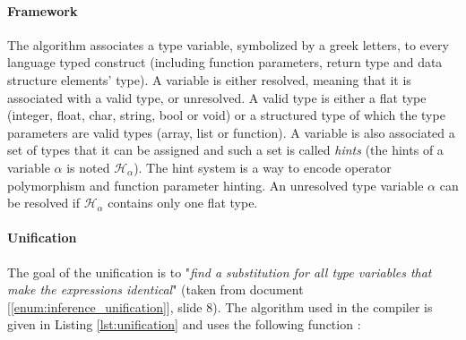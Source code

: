 \documentclass[a4paper,11pt]{article}
\begin{document}
\paragraph{Framework} The algorithm associates a type variable, symbolized by a greek letters, to every language typed construct (including function parameters, return type and data structure elements' type). A variable is either resolved, meaning that it is associated with a valid type, or unresolved. A valid type is either a flat type (integer, float, char, string, bool or void) or a structured type of which the type parameters are valid types (array, list or function). A variable is also associated a set of types that it can be assigned and such a set is called \textit{hints} (the hints of a variable $\alpha$ is noted $\mathcal{H}_\alpha$). The hint system is a way to encode operator polymorphism and function parameter hinting. An unresolved type variable $\alpha$ can be resolved if $\mathcal{H}_\alpha$ contains only one flat type. 
\paragraph{Unification} The goal of the unification is to "\textit{find a substitution for all type variables that make the expressions identical}" (taken from document [\ref{enum:inference_unification}], slide 8). The algorithm used in the compiler is given in Listing \ref{lst:unification} and uses the following function : 
\end{document}
